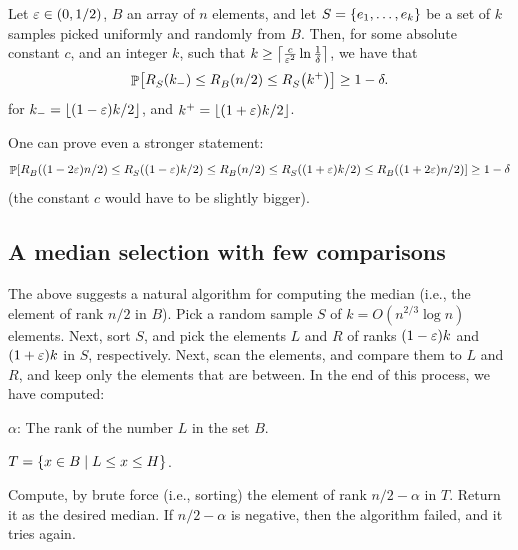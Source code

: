 \begin{lemma}
    Let ${\varepsilon} \in (0,1/2)$, $B$ an array of $n$ elements, and let
    $S = \left\{ {e_1, \ldots, e_k} \right\}$ be a set of $k$ samples picked
    uniformly and randomly from $B$. Then, for some absolute constant
    $c$, and an integer $k$, such that
    $k\geq \left\lceil {\frac{c}{{\varepsilon}^2} \ln \frac{1}{\delta}} \right\rceil $, we have
    that
    \begin{equation*}
        \Prob{%
           \rankY{S}{k_- }
           \leq
           \rankY{B}{n/2}
           \leq
           \rankY{S}{k^+} }
        \geq 1-\delta.
    \end{equation*}
    for $k_- = \left\lfloor {(1-{\varepsilon})k/2} \right\rfloor$, and $k^+ = \left\lfloor {(1+{\varepsilon})k/2} \right\rfloor$.

    One can prove even a stronger statement:
    \begin{equation*}
        \Prob{%
           \rankY{B}{(1-2\eps)n/2}
           \leq %
           \rankY{S}{(1-\eps)k/2 }
           \leq
           \rankY{B}{n/2}
           \leq
           \rankY{S}{(1+\eps)k/2}
           \leq%
           \rankY{B}{(1+2\eps)n/2}
        }
      \geq 1-\delta        
    \end{equation*}
    (the constant $c$ would have to be slightly bigger).
\end{lemma}



\subsection{A median selection with few comparisons}


The above suggests a natural algorithm for computing the median (i.e.,
the element of rank $n/2$ in $B$). Pick a random sample $S$ of
$k = O(n^{2/3} \log n)$ elements. Next, sort $S$, and pick the
elements $L$ and $R$ of ranks $(1-{\varepsilon})k$ and $(1+{\varepsilon})k$ in $S$,
respectively. Next, scan the elements, and compare them to $L$ and
$R$, and keep only the elements that are between. In the end of this
process, we have computed:

\begin{compactenumA}
    \smallskip%
    \item $\alpha$: The rank of the number $L$ in the set $B$.
    \smallskip%
    \item $T = \left\{  x \in B \;\middle\vert\; L \leq x \leq H \right\}$.
\end{compactenumA}
\smallskip%
Compute, by brute force (i.e., sorting) the element of rank
$n/2 - \alpha$ in $T$. Return it as the desired median. If
$n/2 - \alpha$ is negative, then the algorithm failed, and it tries
again.

